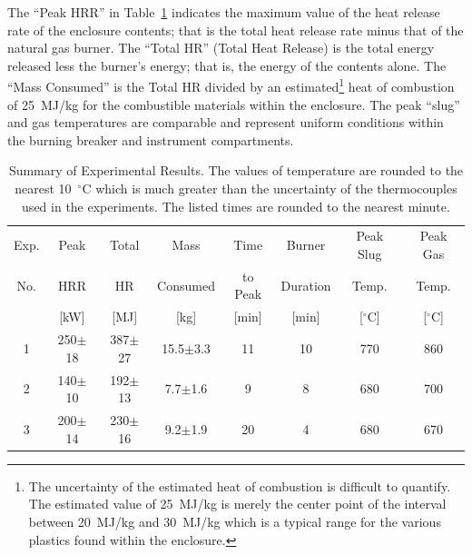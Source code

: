\documentclass[12pt]{article}
\begin{document}
The ``Peak HRR'' in Table~\ref{matrix} indicates the maximum value of the heat release rate of the enclosure contents; that is the total heat release rate minus that of the natural gas burner. The ``Total HR'' (Total Heat Release) is the total energy released less the burner's energy; that is, the energy of the contents alone. The ``Mass Consumed'' is the Total HR divided by an estimated\footnote{The uncertainty of the estimated heat of combustion is difficult to quantify. The estimated value of 25~MJ/kg is merely the center point of the interval between 20~MJ/kg and 30~MJ/kg which is a typical range for the  various plastics found within the enclosure.} heat of combustion of 25~MJ/kg for the combustible materials within the enclosure. The peak ``slug'' and gas temperatures are comparable and represent uniform conditions within the burning breaker and instrument compartments.


\begin{table}[ht]
\begin{center}
\caption[Summary of Experimental Results]{Summary of Experimental Results. The values of temperature are rounded to the nearest 10~$^\circ$C which is much greater than the uncertainty of the thermocouples used in the experiments. The listed times are rounded to the nearest minute.}
\label{matrix}
\begin{tabular}{|c|c|c|c|c|c|c|c|}
\hline
Exp.   & Peak           & Total     	& Mass          	& Time             & Burner       & Peak Slug    & Peak Gas      \\
No.    & HRR            & HR            & Consumed          & to Peak          & Duration     & Temp.        & Temp.         \\
       & [kW]      	    & [MJ]	        & [kg]        		& [min]  		   & [min] 	      & [$^\circ$C]  & [$^\circ$C]   \\ \hline
1	   & 250$\pm$18	    & 387$\pm$27	& 15.5$\pm$3.3	    & 11          	   & 10           & 770          & 860           \\ \hline
2	   & 140$\pm$10	    & 192$\pm$13	& 7.7$\pm$1.6	    & 9	               & 8            & 680          & 700           \\ \hline
3	   & 200$\pm$14	    & 230$\pm$16	& 9.2$\pm$1.9	    & 20        	   & 4            & 680          & 670           \\ \hline
\end{tabular}
\end{center}
\end{table}
\end{document}

